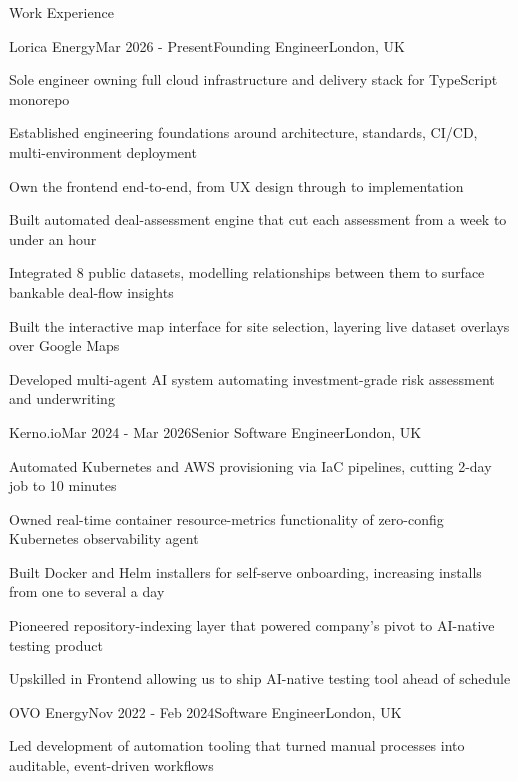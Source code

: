 \documentclass{resume} %
\begin{document}

\begin{rSection}{Work Experience}
    \begin{rSubsection}{Lorica Energy}{Mar 2026 - Present}{Founding Engineer}{London, UK}
    \item Sole engineer owning full cloud infrastructure and delivery stack for TypeScript monorepo
    \item Established engineering foundations around architecture, standards, CI/CD, multi-environment deployment
    \item Own the frontend end-to-end, from UX design through to implementation
    \item Built automated deal-assessment engine that cut each assessment from a week to under an hour
    \item Integrated 8 public datasets, modelling relationships between them to surface bankable deal-flow insights
    \item Built the interactive map interface for site selection, layering live dataset overlays over Google Maps
    \item Developed multi-agent AI system automating investment-grade risk assessment and underwriting
  \end{rSubsection}
    \begin{rSubsection}{Kerno.io}{Mar 2024 - Mar 2026}{Senior Software Engineer}{London, UK}
    \item Automated Kubernetes and AWS provisioning via IaC pipelines, cutting 2-day job to 10 minutes
    \item Owned real-time container resource-metrics functionality of zero-config Kubernetes observability agent
    \item Built Docker and Helm installers for self-serve onboarding, increasing installs from one to several a day
    \item Pioneered repository-indexing layer that powered company's pivot to AI-native testing product
    \item Upskilled in Frontend allowing us to ship AI-native testing tool ahead of schedule
  \end{rSubsection}
  \begin{rSubsection}{OVO Energy}{Nov 2022 - Feb 2024}{Software Engineer}{London, UK}
    \item Led development of automation tooling that turned manual processes into auditable, event-driven workflows

\end{rSubsection}
\end{rSection}
\end{document}

